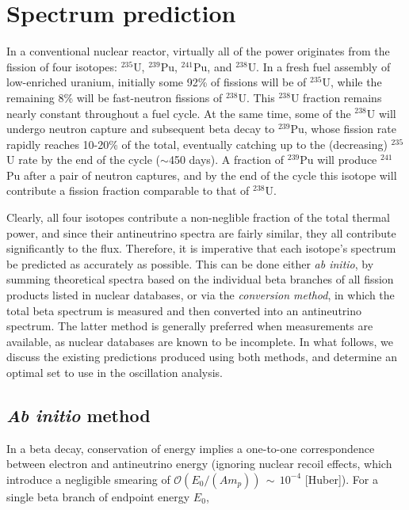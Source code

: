 \documentclass[../thesis.tex]{subfiles}
\begin{document}
\section{Spectrum prediction}
\label{sec:specpred}

\def\urfive{$^{235}$U\xspace}
\def\punine{$^{239}$Pu\xspace}
\def\puone{$^{241}$Pu\xspace}
\def\ureight{$^{238}$U\xspace}
\def\nubar{$\bar\nu$\xspace}

In a conventional nuclear reactor, virtually all of the power originates from the fission of four isotopes: \urfive, \punine, \puone, and \ureight. In a fresh fuel assembly of low-enriched uranium, initially some 92\% of fissions will be of \urfive, while the remaining 8\% will be fast-neutron fissions of \ureight. This \ureight fraction remains nearly constant throughout a fuel cycle. At the same time, some of the \ureight will undergo neutron capture and subsequent beta decay to \punine, whose fission rate rapidly reaches 10-20\% of the total, eventually catching up to the (decreasing) \urfive rate by the end of the cycle ($\sim$450 days). A fraction of \punine will produce \puone after a pair of neutron captures, and by the end of the cycle this isotope will contribute a fission fraction comparable to that of \ureight.

Clearly, all four isotopes contribute a non-neglible fraction of the total thermal power, and since their antineutrino spectra are fairly similar, they all contribute significantly to the flux. Therefore, it is imperative that each isotope's spectrum be predicted as accurately as possible. This can be done either \emph{ab initio}, by summing theoretical spectra based on the individual beta branches of all fission products listed in nuclear databases, or via the \emph{conversion method}, in which the total beta spectrum is measured and then converted into an antineutrino spectrum. The latter method is generally preferred when measurements are available, as nuclear databases are known to be incomplete. In what follows, we discuss the existing predictions produced using both methods, and determine an optimal set to use in the oscillation analysis.

\subsection{\textit{Ab initio} method}
\label{sec:abinitio}

In a beta decay, conservation of energy implies a one-to-one correspondence between electron and antineutrino energy (ignoring nuclear recoil effects, which introduce a negligible smearing of $\mathcal{O}(E_0/(Am_p))\,\sim\,10^{-4}$ [Huber]). For a single beta branch of endpoint energy $E_0$,
\end{document}
